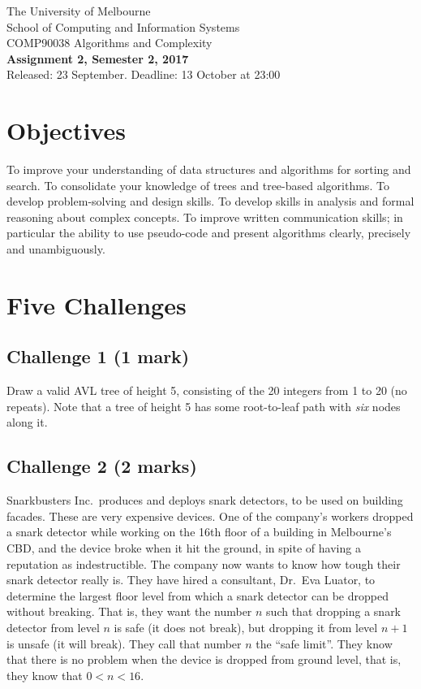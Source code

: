 \documentclass[11pt]{article}
\begin{document}
\begin{center}
{\sc The University of Melbourne
\\
School of Computing and Information Systems
\\ 
COMP90038 Algorithms and Complexity}
\bigskip \\
{\Large\bf Assignment 2, Semester 2, 2017}
\bigskip \\
{\large Released: 23 September.  Deadline: 13 October at 23:00}
\end{center}

\section*{Objectives}

To improve your understanding of data structures and algorithms for
sorting and search.
To consolidate your knowledge of trees and tree-based algorithms.
To develop problem-solving and design skills.
To develop skills in analysis and formal reasoning about
complex concepts.
To improve written communication skills; in particular the
ability to use pseudo-code and present algorithms clearly, 
precisely and unambiguously.

\section*{Five Challenges}

\subsection*{Challenge 1 \hfill {\small (1 mark)}}

Draw a valid AVL tree of height 5, consisting of the 20 integers
from 1 to 20 (no repeats).
Note that a tree of height 5 has some root-to-leaf path with
\emph{six} nodes along it.

\subsection*{Challenge 2 \hfill {\small (2 marks)}}

Snarkbusters Inc.\ produces and deploys snark detectors, 
to be used on building facades.
These are very expensive devices.
One of the company's workers dropped a snark detector while working on the 
16th floor of a building in Melbourne's CBD, and the device broke when it
hit the ground, in spite of having a reputation as indestructible.
The company now wants to know how tough their snark detector really is.
They have hired a consultant, Dr.\ Eva Luator, to determine the 
largest floor level from which a snark detector can be dropped
without breaking.  
That is, they want the number $n$ such that dropping a snark detector
from level $n$ is safe (it does not break), but dropping it from
level $n+1$ is unsafe (it will break).
They call that number $n$ the ``safe limit''.
They know that there is no problem when the device is dropped from ground
level, that is, they know that $0 < n < 16$.
\end{document}
